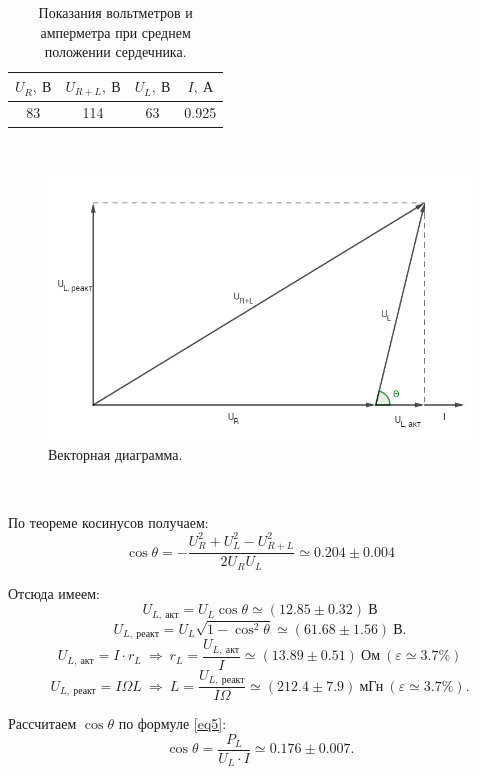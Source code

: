 \documentclass[a4paper, 12pt, twoside]{article}
\begin{document}
\begin{minipage}{0.3\linewidth}
	\begin{table}[H]
		\centering
		\caption{Показания вольтметров и амперметра при среднем положении сердечника.}
		\begin{tabular}{c|c|c|c}\toprule
			$U_R,~\text{В}$ & $U_{R+L},~\text{В}$ & $U_L,~\text{В}$ & $I,~\text{А}$ \\ \midrule
			83              & 114                 & 63  & 0.925 \\ \bottomrule            
		\end{tabular}
	\end{table}
\end{minipage}
~
\begin{minipage}{0.69\linewidth}
\begin{figure}[H]
	\centering
	\includegraphics[width = 0.8\linewidth]{vdiagr}
	\caption{Векторная диаграмма.}
\end{figure}
\end{minipage}

~

По теореме косинусов получаем:
$$\cos \theta = -\dfrac{U_R^2+U_L^2-U_{R+L}^2}{2U_R U_L} \simeq 0.204 \pm 0.004$$

Отсюда имеем:
$$U_{L,~\text{акт}} = U_L  \cos \theta \simeq (12.85 \pm 0.32)~\text{В}$$
$$U_{L,~\text{реакт}} = U_L \sqrt{1-\cos^2 \theta} \simeq (61.68 \pm 1.56)~\text{В}.$$
$$U_{L,~\text{акт}} = I\cdot r_L ~ \Rightarrow ~ r_L = \dfrac{U_{L,~\text{акт}}}{I}\simeq (13.89 \pm 0.51)~\text{Ом}~(\varepsilon \simeq 3.7\%)$$
$$U_{L,~\text{реакт}} = I\Omega L ~ \Rightarrow ~ L = \dfrac{U_{L,~\text{реакт}}}{I\Omega} \simeq (212.4 \pm 7.9)~\text{мГн}~(\varepsilon \simeq 3.7 \%).$$

Рассчитаем $\cos \theta$ по формуле \eqref{eq5}:
$$\cos \theta = \dfrac{P_L}{U_L\cdot I} \simeq 0.176 \pm 0.007.$$
\end{document}
